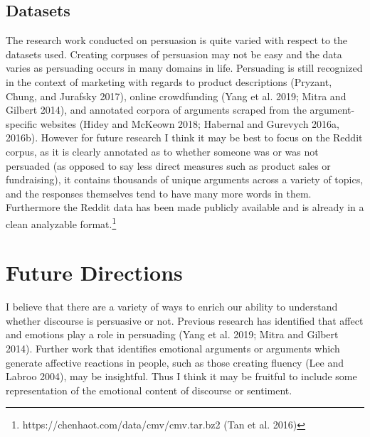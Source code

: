 \documentclass[11pt,a4paper]{article}
\begin{document}







\subsection{Datasets}
The research work conducted on persuasion is quite varied with respect to the datasets used. Creating corpuses of persuasion may not be easy and the data varies as persuading occurs in many domains in life.  Persuading is still recognized in the context of marketing with regards to product descriptions (Pryzant, Chung,  and Jurafsky 2017), online crowdfunding (Yang et al. 2019; Mitra and Gilbert 2014), and annotated corpora of arguments scraped from the argument-specific websites (Hidey and McKeown 2018; Habernal and Gurevych 2016a, 2016b). However for future research I think it may be best to focus on the Reddit corpus, as it is clearly annotated as to whether someone was or was not persuaded (as opposed to say less direct measures such as product sales or fundraising), it contains thousands of unique arguments across a variety of topics, and the responses themselves tend to have many more words in them. Furthermore the Reddit data has been made publicly available and is already in a clean analyzable format.\footnote{https://chenhaot.com/data/cmv/cmv.tar.bz2 (Tan et al. 2016)}

\section{Future Directions}

I believe that there are a variety of ways to enrich our ability to understand whether discourse is persuasive or not. Previous research has identified that affect and emotions play a role in persuading (Yang et al. 2019; Mitra and Gilbert 2014). Further work that identifies emotional arguments or arguments which generate affective reactions in people, such as those creating fluency (Lee and Labroo 2004), may be insightful. Thus I think it may be fruitful to include some representation of the emotional content of discourse or sentiment.
\end{document}
